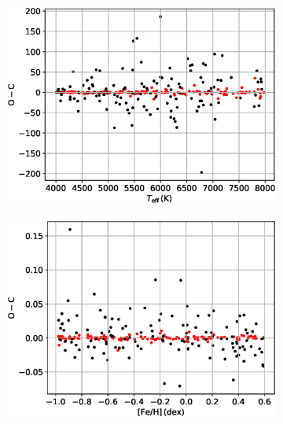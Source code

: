  \begin{figure}
\centering
 \begin{subfigure}[b]{0.5\linewidth}
    \centering
    \includegraphics[width=\linewidth]{5-images/selfT.eps} 
    \label{fig7:a} 
    \vspace{4ex}
  \end{subfigure}%
  \begin{subfigure}[b]{0.5\linewidth}
    \centering
    \includegraphics[width=\linewidth]{5-images/selfM.eps} 
    \label{fig7:b} 
    \vspace{4ex}
  \end{subfigure} 
  \begin{subfigure}[b]{0.5\linewidth}
    \centering

\end{subfigure}
\end{figure}
